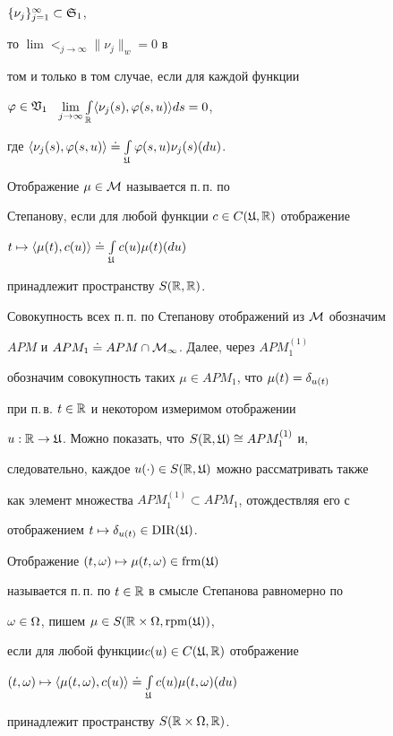 $\{\nu_{j}\}_{j=1}^{\infty}\subset \frak S_{1}$,


то $\lim\lt_{j\to\infty}\|\nu_{j}\|_{w}=0$ в


том и только в том случае, если для каждой функции


$\vfi\in\frak V_{1}$ \ $\lim\lt_{j\to\infty}\int\lt_{\R}


\la\nu_{j}(s),\vfi(s,u)\ra ds=0$,


где $\la\nu_{j}(s),\vfi(s,u)\ra\doteq


\int\lt_{\frak U}\vfi(s,u)\nu_{j}(s)(du)$.





\begin{defns}


Отображение $\mu\in\cal M$ называется п.\,п. по


Степанову, если для любой функции $c\in C(\frak U,\Bbb R)$ отображение


$t\mapsto\langle\mu(t),c(u)\rangle\doteq\int\limits_{\frak U}c(u)\mu(t)(du)$


принадлежит пространству $S(\Bbb R,\Bbb R)$.


\end{defns}





Совокупность всех п.\,п. по Степанову отображений из $\cal M$ обозначим


$APM$ и $APM_1\doteq APM\cap\cal M_1$. Далее, через $APM_1^{(1)}$


обозначим совокупность таких $\mu\in APM_1$, что $\mu(t)=\delta_{u(t)}$


при п.\,в. $t\in\Bbb R$ и некотором измеримом отображении


$u:\Bbb R\to\frak U$. Можно показать, что $S(\Bbb R,\frak U)\cong APM_1^{(1)}$ и,


следовательно, каждое $u(\cdot)\in S(\Bbb R,\frak U)$ можно рассматривать также


как элемент множества $APM_1^{(1)}\subset APM_1$, отождествляя его с


отображением $t\mapsto \delta_{u(t)}\in \operatorname{DIR}(\frak U)$.





\begin{defns}


Отображение $(t,\omega)\mapsto\mu(t,\omega) \in\operatorname{frm}(\frak U)$


называется п.\,п. по $t\in\Bbb R$ в смысле Степанова равномерно по


$\omega\in\Omega$, пишем $\mu\in S(\Bbb R\times\Omega,\operatorname{rpm}(\frak U))$,


если для любой функции\linebreak $c(u)\in C(\frak U,\Bbb R)$ отображение


$(t,\om)\mapsto\la\mu(t,\om),c(u)


\ra\doteq\int\lt_{\frak U}c(u)\mu(t,\om)(du)$


принадлежит пространству $S(\Bbb R\times\Omega,\Bbb R)$.


\end{defns}





